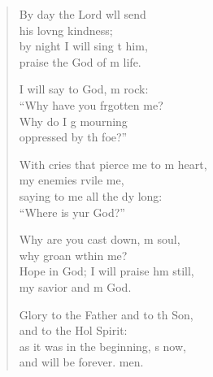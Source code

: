 \begin{verse}
\begin{patverse}
By day the Lord w\pointup{\i}ll send\Med\\
his lov\pointup{\i}ng kindness;\\
by night I will sing t him,\Med\\
praise the God of m life.

I will say to God, m rock:\Med\\
“Why have you frgotten me?\\
Why do I g mourning\Med\\
oppressed by th foe?”

With cries that pierce me to m heart,\Med\\
my enemies rvile me,\\
saying to me all the dy long:\Med\\
“Where is yur God?”

Why are you cast down, m soul,\Med\\
why groan w\pointup{\i}thin me?\\
Hope in God; I will praise h\pointup{\i}m still,\Med\\
my savior and m God.

Glory to the Father and to th Son,\Med\\
and to the Hol Spirit:\\
as it was in the beginning, \pointup{\i}s now,\Med\\
and will be forever. men. 
  \end{patverse}
\end{verse}
